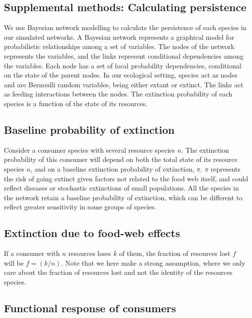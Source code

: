 \documentclass[12pt]{article}
\begin{document}
\begin{spacing}{2.0}
\clearpage

\section{Supplemental methods: Calculating persistence}        

        We use Bayesian network modelling to calculate the persistence of each species in our simulated networks. 
        A Bayesian network represents a graphical model for probabilistic relationships among a set of variables. The nodes of the network represents the variables, and the links represent conditional dependencies among the variables. Each node has a set of local probability dependencies, conditional on the state of the parent nodes. 
        In our ecological setting, species act as nodes and are Bernoulli random variables, being either extant or extinct. The links act as feeding interactions between the nodes.
        The extinction probability of each species is a function of the state of its resources.


    \subsection{Baseline probability of extinction}

        Consider a consumer species with several resource species $n$. 
        The extinction probability
        of this consumer will depend on both the total state of its resource species $n$, and on a
        baseline extinction probability of extinction, $\pi$. 
        $\pi$ represents the risk of going extinct
        given factors not related to the food web itself, and could reflect diseases or stochastic
        extinctions of small populations. 
        All the species in the network retain a baseline
        probability of extinction, which can be different to reflect greater sensitivity in some groups of species. 


    \subsection{Extinction due to food-web effects}

        If a consumer with $n$ resources loses $k$ of them, the fraction of resources lost $f$ will be
        $f = (k/n)$. 
        Note that we here make a strong assumption, where we only care about the fraction of resources lost and not the identity of the resources species.


    \subsection{Functional response of consumers}


\end{spacing}
\end{document}
